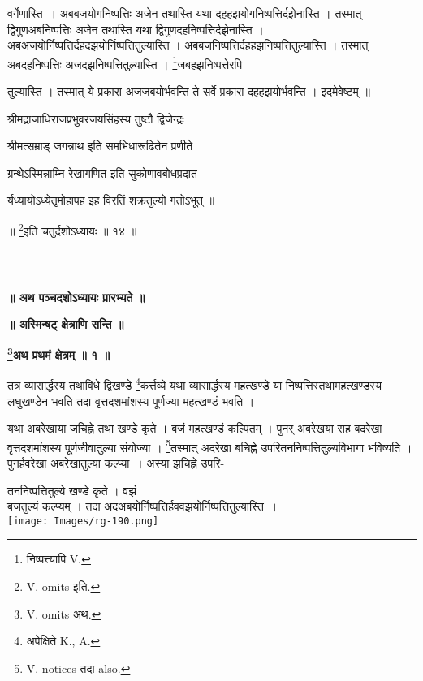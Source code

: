 \documentclass[11pt, openany]{book}
\begin{document}
\noindent वर्गेणास्ति~। अबबजयोगनिष्पत्तिः अजेन तथास्ति यथा दहहझयोगनिष्पत्तिर्दझेनास्ति । तस्मात् द्विगुणअबनिष्पत्तिः अजेन तथास्ति यथा द्विगुणदहनिष्पत्तिर्दझेनास्ति ।
अबअजयोर्निष्पत्तिर्दहदझयोर्निष्पत्तितुल्यास्ति । अबबजनिष्पत्तिर्दहहझनिष्पत्तितुल्यास्ति । तस्मात्
अबदहनिष्पत्तिः अजदझनिष्पत्तितुल्यास्ति । \renewcommand{\thefootnote}{१}\footnote{निष्पत्त्यापि {\en V.}}जबहझनिष्पत्तेरपि


\newpage
\noindent तुल्यास्ति । तस्मात् ये प्रकारा अजजबयोर्भवन्ति ते सर्वे प्रकारा दहहझयोर्भवन्ति । इदमेवेष्टम् ॥\\
\begin{center}
{\small श्रीमद्राजाधिराजप्रभुवरजयसिंहस्य तुष्टौ द्विजेन्द्रः

श्रीमत्सम्राड् जगन्नाथ इति समभिधारूढितेन प्रणीते

ग्रन्थेऽस्मिन्नाम्नि रेखागणित इति सुकोणावबोधप्रदात-

र्यध्यायोऽध्येतृमोहापह इह विरतिं शक्रतुल्यो गतोऽभूत् ॥

 ॥ \renewcommand{\thefootnote}{१}\footnote{{\en V. omits} इति.}इति चतुर्दशोऽध्यायः ॥ १४ ॥} \\
 \rule{0.7in}{0.3pt}
 \end{center}


\newpage
{}
\afterpage{\fancyhead[LE,RO]{\thepage}}
\cfoot{}
\newpage
\newpage
\thispagestyle{empty}
\begin{center}
\textbf{\LARGE ॥ अथ पञ्चदशोऽध्यायः प्रारभ्यते ॥}
\end{center}
\vspace{3mm}

\begin{center}
\textbf{॥ अस्मिन्षट् क्षेत्राणि सन्ति ॥}
\vspace{5mm}

\textbf{\large \renewcommand{\thefootnote}{१}\footnote{{\en V. omits} अथ.}अथ प्रथमं क्षेत्रम् ॥ १ ॥ }
\end{center}
\vspace{2mm}

{\ab तत्र व्यासार्द्धस्य तथाविधे द्विखण्डे \renewcommand{\thefootnote}{२}\footnote{अपेक्षिते {\en K., A.}}कर्त्तव्ये यथा व्यासार्द्धस्य महत्खण्डे या निष्पत्तिस्तथामहत्खण्डस्य लघुखण्डेन भवति तदा वृत्तदशमांशस्य पूर्णज्या महत्खण्डं भवति । }\\
\vspace{3mm}

यथा अबरेखाया जचिह्ने तथा खण्डे कृते । बजं महत्खण्डं कल्पितम् । पुनर् अबरेखया सह बदरेखा वृत्तदशमांशस्य पूर्णजीवातुल्या संयोज्या । \renewcommand{\thefootnote}{३}\footnote{{\en V. notices} तदा {\en also.}}तस्मात् अदरेखा बचिह्ने उपरितननिष्पत्तितुल्यविभागा भविष्यति । पुनर्हवरेखा अबरेखातुल्या कल्प्या~। अस्या झचिह्ने उपरि-
\begin{vwcol}[widths={0.55,0.45}, sep=.8cm, rule=0pt]
तननिष्पत्तितुल्ये खण्डे कृते । वझं\\
\noindent बजतुल्यं कल्प्यम् । तदा अदअबयोर्निष्पत्तिर्हववझयोर्निष्पत्तितुल्यास्ति~। \\
\noindent \texttt{[image: Images/rg-190.png]}  
\end{vwcol}
\vspace{-2mm}
\end{document}
